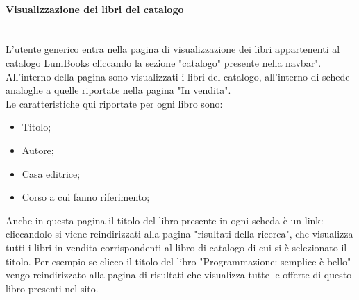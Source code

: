 \paragraph{Visualizzazione dei libri del catalogo}\mbox{}\\
\label{par:VisLibriCatalogo}
L'utente generico entra nella pagina di visualizzazione dei libri appartenenti al catalogo LumBooks cliccando la sezione "catalogo" presente nella navbar".\\
All'interno della pagina sono visualizzati i libri del catalogo, all'interno di schede analoghe a quelle riportate nella pagina "In vendita".\\
Le caratteristiche qui riportate per ogni libro sono:
\begin{itemize}
	\item Titolo;
	\item Autore;
	\item Casa editrice;
	\item Corso a cui fanno riferimento;
\end{itemize}
Anche in questa pagina il titolo del libro presente in ogni scheda è un link: cliccandolo si viene reindirizzati alla pagina "risultati della ricerca", che visualizza tutti i libri in vendita corrispondenti al libro di catalogo di cui si è selezionato il titolo. Per esempio se clicco il titolo del libro "Programmazione: semplice è bello" vengo reindirizzato alla pagina di risultati che visualizza tutte le offerte di questo libro presenti nel sito.

